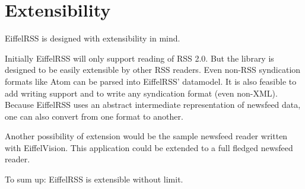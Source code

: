 \documentclass[a4paper,fleqn,titlepage]{article}
\begin{document}
\section{Extensibility}
\label{sec:extensibility}

EiffelRSS is designed with extensibility in mind.

Initially EiffelRSS will only support reading of RSS 2.0. But the
library is designed to be easily extensible by other RSS readers. Even
non-RSS syndication formats like Atom can be parsed into EiffelRSS'
datamodel. It is also feasible to add writing support and to write any
syndication format (even non-XML). Because EiffelRSS uses an abstract
intermediate representation of newsfeed data, one can also convert
from one format to another.

Another possibility of extension would be the sample newsfeed reader
written with EiffelVision. This application could be extended to a
full fledged newsfeed reader.

To sum up: EiffelRSS is extensible without limit.
\end{document}
